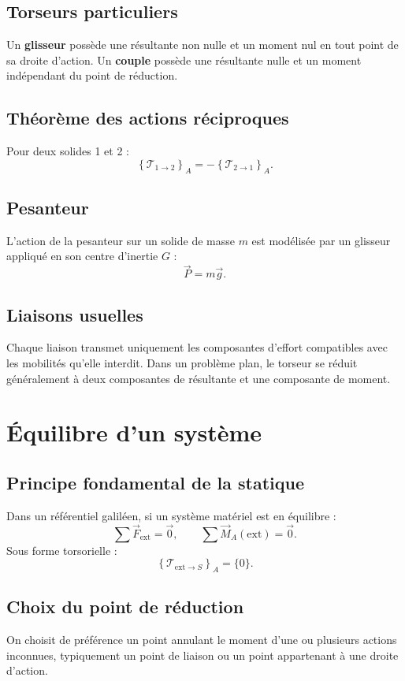 \subsection{Torseurs particuliers}
Un \textbf{glisseur} possède une résultante non nulle et un moment nul en tout point de sa droite d'action. Un \textbf{couple} possède une résultante nulle et un moment indépendant du point de réduction.

\subsection{Théorème des actions réciproques}
Pour deux solides 1 et 2 :
\[
\left\{\mathcal T_{1\rightarrow2}\right\}_A=-\left\{\mathcal T_{2\rightarrow1}\right\}_A.
\]

\subsection{Pesanteur}
L'action de la pesanteur sur un solide de masse $m$ est modélisée par un glisseur appliqué en son centre d'inertie $G$ :
\[
\vec P=m\vec g.
\]

\subsection{Liaisons usuelles}
Chaque liaison transmet uniquement les composantes d'effort compatibles avec les mobilités qu'elle interdit. Dans un problème plan, le torseur se réduit généralement à deux composantes de résultante et une composante de moment.

\section{Équilibre d'un système}
\subsection{Principe fondamental de la statique}
Dans un référentiel galiléen, si un système matériel est en équilibre :
\[
\sum \vec F_{\mathrm{ext}}=\vec 0,
\qquad
\sum \vec M_A(\mathrm{ext})=\vec 0.
\]
Sous forme torsorielle :
\[
\left\{\mathcal T_{\mathrm{ext}\rightarrow S}\right\}_A=\{0\}.
\]

\subsection{Choix du point de réduction}
On choisit de préférence un point annulant le moment d'une ou plusieurs actions inconnues, typiquement un point de liaison ou un point appartenant à une droite d'action.

